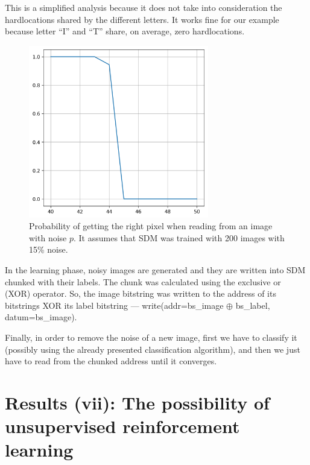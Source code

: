 This is a simplified analysis because it does not take into consideration the hardlocations shared by the different letters. It works fine for our example because letter ``I'' and ``T'' share, on average, zero hardlocations.

\begin{figure}[!htb]
\centering\includegraphics[width=0.7\textwidth]{./images02/filter/prob-right-pixel.png}
\caption{Probability of getting the right pixel when reading from an image with noise $p$. It assumes that SDM was trained with 200 images with 15\% noise.
\label{fig:filter-prob-right-pixel}
}
\end{figure}

In the learning phase, noisy images are generated and they are written into SDM chunked with their labels. The chunk was calculated using the exclusive or (XOR) operator. So, the image bitstring was written to the address of its bitstrings XOR its label bitstring --- write(addr=bs\_image $\oplus$ bs\_label, datum=bs\_image).

Finally, in order to remove the noise of a new image, first we have to classify it (possibly using the already presented classification algorithm), and then we just have to read from the chunked address until it converges.













\chapter{Results (vii): The possibility of unsupervised reinforcement learning}

